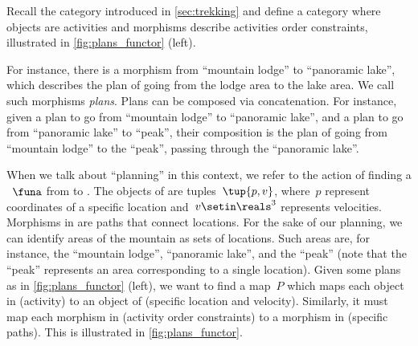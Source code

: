 \begin{example}
    \label{exa:planning-as-search-functor}
    Recall the category \Berg introduced in \cref{sec:trekking} and define a category \Plans where objects are activities and morphisms describe activities order constraints, illustrated in \cref{fig:plans_functor} (left).

    For instance, there is a morphism from ``mountain lodge'' to ``panoramic lake'', which describes the plan of going from the lodge area to the lake area.
    We call such morphisms \emph{plans}.
    Plans can be composed via concatenation.
    For instance, given a plan to go from ``mountain lodge'' to ``panoramic lake'', and a plan to go from ``panoramic lake'' to ``peak'', their composition is the plan of going from ``mountain lodge'' to the ``peak'', passing through the ``panoramic lake''.

    When we talk about ``planning'' in this context, we refer to the action of finding a ~$\funa$ from \Plans to \Berg.
    The objects of \Berg are tuples~$\tup{p,v}$, where~$p$ represent coordinates of a specific location and~$v\setin \reals^3$ represents velocities.
    Morphisms in \Berg are paths that connect locations.
    For the sake of our planning, we can identify areas of the mountain as sets of locations.
    Such areas are, for instance, the ``mountain lodge'', ``panoramic lake'', and the
    ``peak'' (note that the ``peak'' represents an area corresponding to a single location).
    Given some plans as in \cref{fig:plans_functor} (left), we want to find a map~$P$ which maps each object in \Plans (activity) to an object of \Berg (specific location and velocity).
    Similarly, it must map each morphism in \Plans (activity order constraints) to a morphism in \Berg (specific paths).
    This is illustrated in \cref{fig:plans_functor}.
\end{example}

\begin{figure*}[h!]
    \centering
    \caption{Planning .}
    \label{fig:plans_functor}
\end{figure*}

\vfill
\clearpage
\vfill





